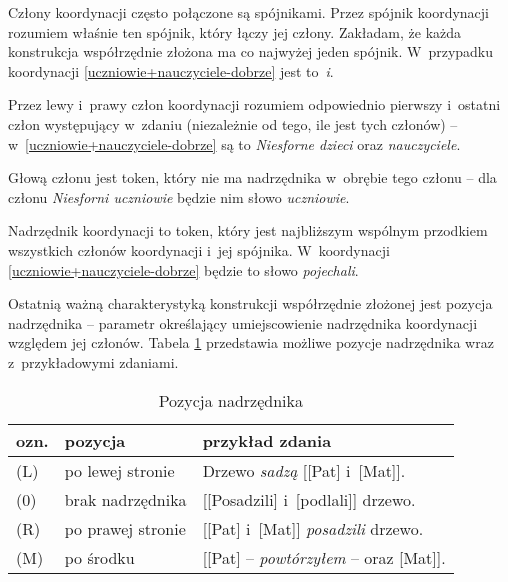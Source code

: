 \begin{exe}
\ex \label{uczniowie+nauczyciele-UD}
\end{exe}

Człony koordynacji często połączone są spójnikami. Przez spójnik koordynacji rozumiem właśnie ten spójnik, który łączy jej człony. Zakładam, że każda konstrukcja współrzędnie złożona ma co najwyżej jeden spójnik. W~przypadku koordynacji \eqref{uczniowie+nauczyciele-dobrze} jest to~\emph{i}.

Przez lewy i~prawy człon koordynacji rozumiem odpowiednio pierwszy i~ostatni człon występujący w~zdaniu (niezależnie od tego, ile jest tych członów) -- w~\eqref{uczniowie+nauczyciele-dobrze} są to \emph{Niesforne dzieci} oraz \emph{nauczyciele}.

Głową członu jest token, który nie ma nadrzędnika w~obrębie tego członu -- dla członu \emph{Niesforni uczniowie} będzie nim słowo \emph{uczniowie}.

Nadrzędnik koordynacji to token, który jest najbliższym wspólnym przodkiem wszystkich członów koordynacji i~jej spójnika. W~koordynacji \eqref{uczniowie+nauczyciele-dobrze} będzie to słowo \emph{pojechali}.

Ostatnią ważną charakterystyką konstrukcji współrzędnie złożonej jest pozycja nadrzędnika -- parametr określający umiejscowienie nadrzędnika koordynacji względem jej członów. Tabela \ref{pozycja-nadrzędnika} przedstawia możliwe pozycje nadrzędnika wraz z~przykładowymi zdaniami.

\begin{table}[!h]
\centering
\begin{tabular}{l l l}
\toprule
ozn.	& pozycja			& przykład zdania								\\
\midrule
(L) & po lewej stronie	& Drzewo \textit{sadzą} [[Pat] i~[Mat]].		\\
(0) & brak nadrzędnika	& [[Posadzili] i~[podlali]] drzewo.				\\
(R) & po prawej stronie	& [[Pat] i~[Mat]] \textit{posadzili} drzewo. 			\\
(M) & po środku			& [[Pat] -- \textit{powtórzyłem} -- oraz [Mat]].	\\
\bottomrule
\end{tabular}
\caption{Pozycja nadrzędnika}
\label{pozycja-nadrzędnika}
\end{table}

